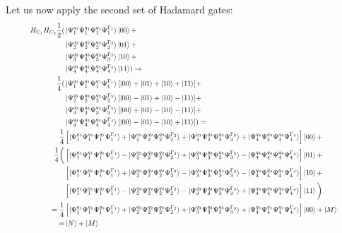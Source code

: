 \documentclass{article}
\begin{document}
Let us now apply the second set of Hadamard gates:
\begin{equation}
   \resizebox{.9\hsize}{!}{$\begin{split}
        H_{C_1}H_{C_2}\frac{1}{2}(
        &\ket{\Psi^{q_1}_1\Psi^{q_1}_1\Psi^{q_1}_1\Psi^{\Gamma_1}_1 }\ket{00}+\\
        &\ket{\Psi^{q_2}_2\Psi^{q_2}_2\Psi^{q_2}_2\Psi^{\Gamma_2}_2 }\ket{01}+\\
        &\ket{\Psi^{q_3}_3\Psi^{q_3}_3\Psi^{q_3}_3\Psi^{\Gamma_3}_3 }\ket{10}+\\
        &\ket{\Psi^{q_4}_4\Psi^{q_4}_4\Psi^{q_4}_4\Psi^{\Gamma_4}_4 }\ket{11}
        )\to\\
        \frac{1}{4}(
            &\ket{\Psi^{q_1}_1\Psi^{q_1}_1\Psi^{q_1}_1\Psi^{\Gamma_1}_1 }[\ket{00}+
            \ket{01}+
            \ket{10}+
            \ket{11}]+\\
            &\ket{\Psi^{q_2}_2\Psi^{q_2}_2\Psi^{q_2}_2\Psi^{\Gamma_2}_2 }[\ket{00}-
            \ket{01}+
            \ket{10}-
            \ket{11}]+\\
            &\ket{\Psi^{q_3}_3\Psi^{q_3}_3\Psi^{q_3}_3\Psi^{\Gamma_3}_3 }[\ket{00}+
            \ket{01}-
            \ket{10}-
            \ket{11}]+\\
            &\ket{\Psi^{q_4}_4\Psi^{q_4}_4\Psi^{q_4}_4\Psi^{\Gamma_4}_4 }[\ket{00}-
            \ket{01}-
            \ket{10}+
            \ket{11}]
    ) =\\ 
        \frac{1}{4}&\left[\ket{\Psi^{q_1}_1\Psi^{q_1}_1\Psi^{q_1}_1\Psi^{\Gamma_1}_1 }+\ket{\Psi^{q_2}_2\Psi^{q_2}_2\Psi^{q_2}_2\Psi^{\Gamma_2}_2 }+\ket{\Psi^{q_3}_3\Psi^{q_3}_3\Psi^{q_3}_3\Psi^{\Gamma_3}_3 }+\ket{\Psi^{q_4}_4\Psi^{q_4}_4\Psi^{q_4}_4\Psi^{\Gamma_4}_4 }\right]\ket{00}+\\
    \frac{1}{4}\bigg(&\left[\ket{\Psi^{q_1}_1\Psi^{q_1}_1\Psi^{q_1}_1\Psi^{\Gamma_1}_1 }-\ket{\Psi^{q_2}_2\Psi^{q_2}_2\Psi^{q_2}_2\Psi^{\Gamma_2}_2 }+\ket{\Psi^{q_3}_3\Psi^{q_3}_3\Psi^{q_3}_3\Psi^{\Gamma_3}_3 }-\ket{\Psi^{q_4}_4\Psi^{q_4}_4\Psi^{q_4}_4\Psi^{\Gamma_4}_4 }\right]\ket{01}+\\
        &\left[\ket{\Psi^{q_1}_1\Psi^{q_1}_1\Psi^{q_1}_1\Psi^{\Gamma_1}_1 }+\ket{\Psi^{q_2}_2\Psi^{q_2}_2\Psi^{q_2}_2\Psi^{\Gamma_2}_2 }-\ket{\Psi^{q_3}_3\Psi^{q_3}_3\Psi^{q_3}_3\Psi^{\Gamma_3}_3 }-\ket{\Psi^{q_4}_4\Psi^{q_4}_4\Psi^{q_4}_4\Psi^{\Gamma_4}_4 }\right]\ket{10}+\\
        &\left[\ket{\Psi^{q_1}_1\Psi^{q_1}_1\Psi^{q_1}_1\Psi^{\Gamma_1}_1 }-\ket{\Psi^{q_2}_2\Psi^{q_2}_2\Psi^{q_2}_2\Psi^{\Gamma_2}_2 }-\ket{\Psi^{q_3}_3\Psi^{q_3}_3\Psi^{q_3}_3\Psi^{\Gamma_3}_3 }+\ket{\Psi^{q_4}_4\Psi^{q_4}_4\Psi^{q_4}_4\Psi^{\Gamma_4}_4 }\right]\ket{11}
    \bigg) \\= 
        \frac{1}{4}&\left[\ket{\Psi^{q_1}_1\Psi^{q_1}_1\Psi^{q_1}_1\Psi^{\Gamma_1}_1 }+\ket{\Psi^{q_2}_2\Psi^{q_2}_2\Psi^{q_2}_2\Psi^{\Gamma_2}_2 }+\ket{\Psi^{q_3}_3\Psi^{q_3}_3\Psi^{q_3}_3\Psi^{\Gamma_3}_3 }+\ket{\Psi^{q_4}_4\Psi^{q_4}_4\Psi^{q_4}_4\Psi^{\Gamma_4}_4 }\right]\ket{00}+\ket{M}\\=&\ket{N}+\ket{M}
   \end{split}$}
\end{equation}
\end{document}
